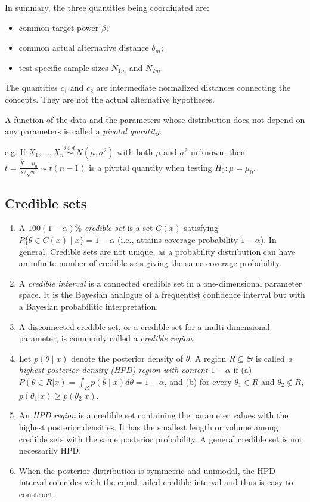 In summary, the three quantities being coordinated are:

\begin{itemize}
    \item common target power $\beta$;
    \item common actual alternative distance $\delta_m$;
    \item test-specific sample sizes $N_{1m}$ and $N_{2m}$.
\end{itemize}
The quantities $c_1$ and $c_2$ are intermediate normalized distances connecting the concepts. They are not the actual alternative hypotheses.


A function of the data and the parameters whose distribution does not depend on any parameters is called a \emph{pivotal quantity}.

e.g. If $X_1,\ldots,X_n \stackrel{i.i.d.}{\sim} N(\mu, \sigma^2)$ with both $\mu$ and $\sigma^2$ unknown, then $t = \frac{\bar{X} - \mu_0}{s/\sqrt{n}} \sim t(n-1)$ is a pivotal quantity when testing $H_0: \mu = \mu_0$.


\subsection{Credible sets}




\begin{enumerate}
    \item A $100(1-\alpha)\%$ \emph{credible set} is a set $C(x)$ satisfying $P\{\theta\in C(x)\mid x\}=1-\alpha$ (i.e., attains coverage probability $1-\alpha$). In general, Credible sets are not unique, as a probability distribution can have an infinite number of credible sets giving the same coverage probability.
    \item A \emph{credible interval} is a connected credible set in a one-dimensional parameter space. It is the Bayesian analogue of a frequentist confidence interval but with a Bayesian probabilitic interpretation.
    \item A disconnected credible set, or a credible set for a multi-dimensional parameter, is commonly called a \emph{credible region}.
    \item Let $p(\theta\mid x)$ denote the posterior density of $\theta$. A region $R\subseteq\Theta$ is called \emph{a highest posterior density (HPD) region with content $1-\alpha$} if 
    (a) $P(\theta\in R | x) = \int_R p(\theta\mid x) d\theta=1-\alpha$, and 
    (b) for every $\theta_1\in R$ and $\theta_2\notin R$, $p(\theta_1 | x)\geq p(\theta_2 | x)$.
    \item An \emph{HPD region} is a credible set containing the parameter values with the highest posterior densities. It has the smallest length or volume among credible sets with the same posterior probability. A general credible set is not necessarily HPD.
    \item When the posterior distribution is symmetric and unimodal, the HPD interval coincides with the equal-tailed credible interval and thus is easy to construct.
\end{enumerate}


